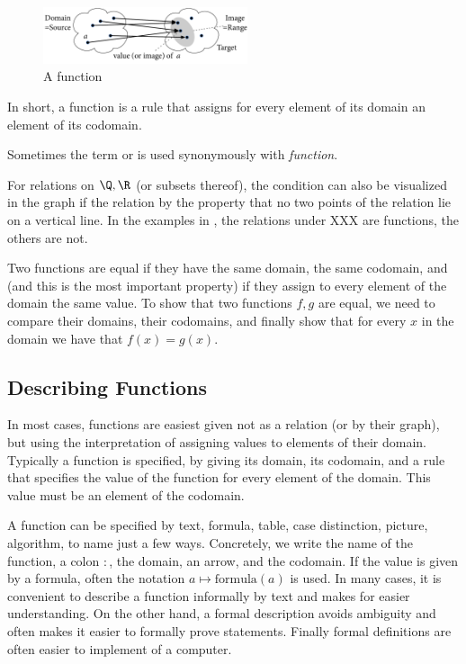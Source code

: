 \begin{figure}[t]
\begin{center}
\includegraphics[width=6cm]{pic/GeneralFct.pdf}
\end{center}
\caption{A function}
\label{figgeneralfct}
\end{figure}

In short, a function is a rule that assigns for every element of its domain
an element of its codomain.

Sometimes the term  or  is used synonymously
with {\em function}.


For relations on $\Q,\R$ (or subsets thereof), the condition can also be
visualized in the graph if the relation by the property that no two points
of the relation lie on a vertical line. In the examples in
, the relations under XXX are functions, the others
are not.

Two functions are equal if they have the same domain, the same codomain, and
(and this is the most important property)
if they assign to every element of the domain the same value.
To show that two functions $f,g$ are equal, we need to compare their
domains, their codomains, and finally show that for every $x$ in the domain
we have that $f(x)=g(x)$.

\subsection{Describing Functions}

In most cases, functions are easiest given not as a relation (or by their
graph), but using the interpretation of assigning values to elements of
their domain.
Typically a function is specified, by
giving its domain, its codomain, and a rule that specifies the value of the
function for every element of the domain. This value must be an element of
the codomain.

A function can be specified by text, formula, table, case distinction, picture,
algorithm, to name just a few ways. Concretely, we write the name of the
function, a colon $\colon$, the domain, an arrow, and the codomain. If the
value is given by a formula, often the notation $a\mapsto \mbox{formula}(a)$
is used. In many cases, it is convenient to describe a function informally
by text and makes for easier understanding. On the other hand, a formal
description avoids ambiguity and often makes it easier to formally prove
statements. Finally formal definitions are often easier to implement of a
computer.

